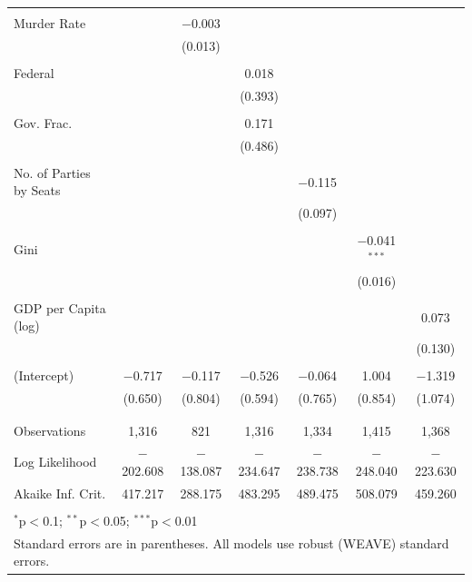 \documentclass[a4paper]{article}\usepackage[]{graphicx}\usepackage[]{color}
\begin{document}
\begin{table}[H]
\begin{center}
{\begin{tabular}{@{\extracolsep{5pt}}lcccccc}
  & & & & & & \\ 
 Murder Rate &  & $-$0.003 &  &  &  &  \\ 
  &  & (0.013) &  &  &  &  \\ 
  & & & & & & \\ 
 Federal &  &  & 0.018 &  &  &  \\ 
  &  &  & (0.393) &  &  &  \\ 
  & & & & & & \\ 
 Gov. Frac. &  &  & 0.171 &  &  &  \\ 
  &  &  & (0.486) &  &  &  \\ 
  & & & & & & \\ 
 No. of Parties by Seats &  &  &  & $-$0.115 &  &  \\ 
  &  &  &  & (0.097) &  &  \\ 
  & & & & & & \\ 
 Gini &  &  &  &  & $-$0.041$^{***}$ &  \\ 
  &  &  &  &  & (0.016) &  \\ 
  & & & & & & \\ 
 GDP per Capita (log) &  &  &  &  &  & 0.073 \\ 
  &  &  &  &  &  & (0.130) \\ 
  & & & & & & \\ 
 (Intercept) & $-$0.717 & $-$0.117 & $-$0.526 & $-$0.064 & 1.004 & $-$1.319 \\ 
  & (0.650) & (0.804) & (0.594) & (0.765) & (0.854) & (1.074) \\ 
  & & & & & & \\ 
\hline \\[-1.8ex] 
Observations & 1,316 & 821 & 1,316 & 1,334 & 1,415 & 1,368 \\ 
Log Likelihood & $-$202.608 & $-$138.087 & $-$234.647 & $-$238.738 & $-$248.040 & $-$223.630 \\ 
Akaike Inf. Crit. & 417.217 & 288.175 & 483.295 & 489.475 & 508.079 & 459.260 \\ 
\hline 
\hline \\[-1.8ex] 
\multicolumn{7}{l}{$^{*}$p$<$0.1; $^{**}$p$<$0.05; $^{***}$p$<$0.01} \\ 
\multicolumn{7}{l}{Standard errors are in parentheses. All models use robust (WEAVE) standard errors.} \\ 
\end{tabular} 

}
\end{center}
\end{table}
\end{document}
